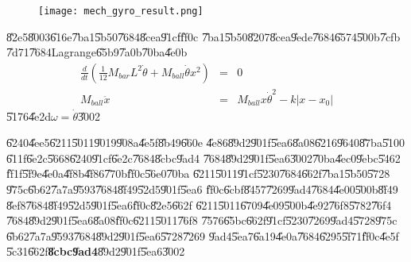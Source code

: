 \begin{center}
\begin{figure}[th]
\caption{{}}
\begin{center}
\texttt{[image: mech\_gyro\_result.png]}
\end{center}
\end{figure}
\end{center}

\U{82e5}\U{8003}\U{616e}\U{7ba1}\U{5b50}\U{7684}\U{8cea}\U{91cf}\U{ff0c}%
\U{7ba1}\U{5b50}\U{8207}\U{8cea}\U{9ede}\U{7684}\U{6574}\U{500b}\U{7cfb}%
\U{7d71}\U{7684}Lagrange\U{65b9}\U{7a0b}\U{70ba}\U{4e0b}%
\begin{eqnarray*}
\frac{d}{dt}\left( \frac{1}{12}M_{bar}L^{2}\dot{\theta}+M_{ball}\dot{\theta}%
x^{2}\right) &=&0 \\
M_{ball}\ddot{x} &=&M_{ball}x\dot{\theta}^{2}-k\left\vert x-x_{0}\right\vert
\end{eqnarray*}%
\U{5176}\U{4e2d}$\omega =\dot{\theta}$\U{3002}

\U{6240}\U{4ee5}\U{6211}\U{5011}\U{9019}\U{908a}\U{4e5f}\U{8b49}\U{660e}%
\U{4e86}\U{89d2}\U{901f}\U{5ea6}\U{8a08}\U{6216}\U{9640}\U{87ba}\U{5100}%
\U{611f}\U{6e2c}\U{5668}\U{6240}\U{91cf}\U{6e2c}\U{7684}\U{8cbc}\U{9ad4}%
\U{7684}\U{89d2}\U{901f}\U{5ea6}\U{3002}\U{70ba}\U{4ec0}\U{9ebc}\U{5462}%
\U{ff1f}\U{5f9e}\U{4e0a}\U{4f8b}\U{4f86}\U{770b}\U{ff0c}\U{56e0}\U{70ba}%
\U{6211}\U{5011}\U{91cf}\U{5230}\U{7684}\U{662f}\U{7ba1}\U{5b50}\U{5728}%
\U{975c}\U{6b62}\U{7a7a}\U{9593}\U{7684}\U{8f49}\U{52d5}\U{901f}\U{5ea6}%
\U{ff0c}\U{6cbf}\U{8457}\U{7269}\U{9ad4}\U{7684}\U{4e00}\U{500b}\U{8f49}%
\U{8ef8}\U{7684}\U{8f49}\U{52d5}\U{901f}\U{5ea6}\U{ff0c}\U{82e5}\U{662f}%
\U{6211}\U{5011}\U{6709}\U{4e09}\U{500b}\U{4e92}\U{76f8}\U{5782}\U{76f4}%
\U{7684}\U{89d2}\U{901f}\U{5ea6}\U{8a08}\U{ff0c}\U{6211}\U{5011}\U{76f8}%
\U{7576}\U{65bc}\U{662f}\U{91cf}\U{5230}\U{7269}\U{9ad4}\U{5728}\U{975c}%
\U{6b62}\U{7a7a}\U{9593}\U{7684}\U{89d2}\U{901f}\U{5ea6}\U{5728}\U{7269}%
\U{9ad4}\U{5ea7}\U{6a19}\U{4e0a}\U{7684}\U{6295}\U{5f71}\U{ff0c}\U{4e5f}%
\U{5c31}\U{662f}\textbf{\U{8cbc}\U{9ad4}}\U{89d2}\U{901f}\U{5ea6}\U{3002}%
\bigskip

